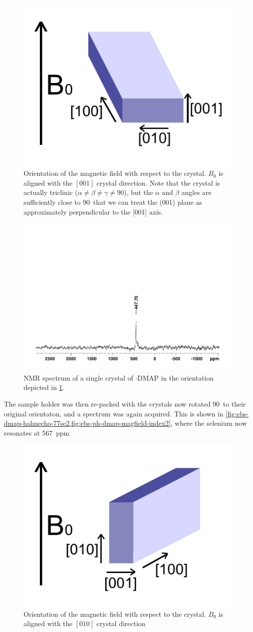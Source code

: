 \begin{refsection}
\begin{figure}
  \centering
  \includegraphics[width=0.3\linewidth]{Figures/ebs-ph-dmap-magfield-index.pdf}
  \caption{Orientation of the magnetic field with respect to the crystal. $B_{0}$ is aligned with the $[0 0 1]$ crystal direction. Note that the crystal is actually triclinic ($\alpha\neq\beta\neq\gamma\neq 90$\degree), but the $\alpha$ and $\beta$ angles are sufficiently close to 90\degree\ that we can treat the (001) plane as approximately perpendicular to the [001] axis.}
  \label{fig:ebs-ph-dmap-magfield-index}
\end{figure}

\begin{figure}
  \centering
  \includegraphics[width=0.8\linewidth]{Figures/ebs-dmap-hahnecho-77se.pdf}
  \caption{ NMR spectrum of a single crystal of $\cdot$DMAP in the orientation depicted in \cref{fig:ebs-ph-dmap-magfield-index}.}
  \label{fig:ebs-dmap-hahnecho-77se}
\end{figure}

The sample holder was then re-packed with the crystals now rotated 90\degree\ to their original orientaton, and a spectrum was again acquired.
This is shown in \cref{fig:ebs-dmap-hahnecho-77se2,fig:ebs-ph-dmap-magfield-index2}, where the selenium now resonates at 567~ppm

\begin{figure}
  \centering
  \includegraphics[width=0.3\linewidth]{Figures/ebs-ph-dmap-magfield-index2.pdf}
  \caption{Orientation of the magnetic field with respect to the crystal. $B_{0}$ is aligned with the $[0 1 0]$ crystal direction}
  \label{fig:ebs-ph-dmap-magfield-index2}
\end{figure}


\end{refsection}
